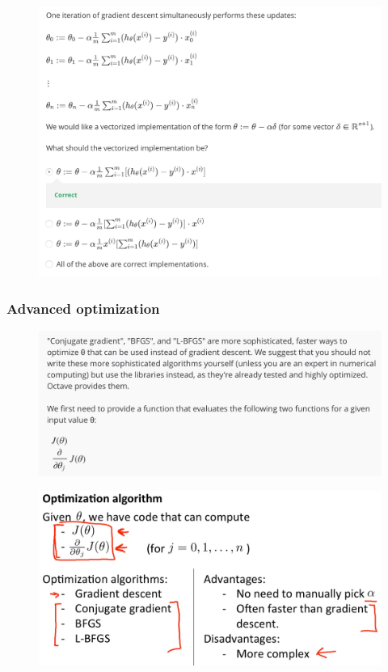 \documentclass[12pt, A4,onecolumn]{article} %
\begin{document}
\begin{figure}[H]
	\centering
	\includegraphics[width=1\textwidth]{./Imagenes/testCostFuncSimple2}
\end{figure}

\newpage

\subsubsection{Advanced optimization}
\begin{figure}[H]
	\centering
	\includegraphics[width=1\textwidth]{./Imagenes/advOpt1}
\end{figure}

\begin{figure}[H]
	\centering
	\includegraphics[width=1\textwidth]{./Imagenes/advOpt2}
\end{figure}
\end{document}

